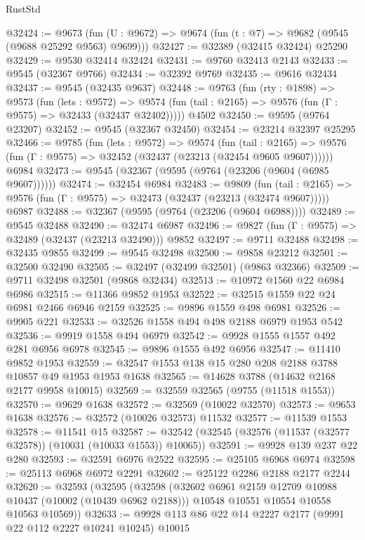 \begin{lexlean}{RustStd}
\begin{coremodule}
@32424 := @9673
    (fun (U : @9672) => @9674 (fun (t : @7) => @9682 (@9545 (@9688 @25292 @9563) @9699)))
@32427 := @32389 (@32415 @32424) @25290
@32429 := @9530 @32414 @32424
@32431 := @9760 @32413 @2143
@32433 := @9545 (@32367 @9766)
@32434 := @32392 @9769
@32435 := @9616 @32434
@32437 := @9545 (@32435 @9637)
@32448 := @9763
    (fun (rty : @1898) =>
    @9573
      (fun (lets : @9572) =>
      @9574 (fun (tail : @2165) => @9576 (fun (Γ : @9575) => @32433 (@32437 @32402)))))
    @4502
@32450 := @9595 (@9764 @23207)
@32452 := @9545 (@32367 @32450)
@32454 := @23214 @32397 @25295
@32466 := @9785
    (fun (lets : @9572) =>
    @9574
      (fun (tail : @2165) =>
      @9576 (fun (Γ : @9575) => @32452 (@32437 (@23213 (@32454 @9605 @9607))))))
    @6984
@32473 := @9545 (@32367 (@9595 (@9764 (@23206 (@9604 (@6985 @9607))))))
@32474 := @32454 @6984
@32483 := @9809
    (fun (tail : @2165) => @9576 (fun (Γ : @9575) => @32473 (@32437 (@23213 (@32474 @9607)))))
    @6987
@32488 := @32367 (@9595 (@9764 (@23206 (@9604 @6988))))
@32489 := @9545 @32488
@32490 := @32474 @6987
@32496 := @9827 (fun (Γ : @9575) => @32489 (@32437 (@23213 @32490))) @9852
@32497 := @9711 @32488
@32498 := @32435 @9855
@32499 := @9545 @32498
@32500 := @9858 @23212
@32501 := @32500 @32490
@32505 := @32497 (@32499 @32501) (@9863 @32366)
@32509 := @9711 @32498 @32501 (@9868 @32434)
@32513 := @10972 @1560 @22 @6984 @6986
@32515 := @11366 @9852 @1953
@32522 := @32515 @1559 @22 @24 @6981 @2466 @6946 @2159
@32525 := @9896 @1559 @498 @6981
@32526 := @9905 @221
@32533 := @32526 @1558 @494 @498 @2188 @6979 @1953 @542
@32536 := @9919 @1558 @494 @6979
@32542 := @9928 @1555 @1557 @492 @281 @6956 @6978
@32545 := @9896 @1555 @492 @6956
@32547 := @11410 @9852 @1953
@32559 := @32547 @1553 @138 @15 @280 @208 @2188 @3788 @10857 @49 @1953 @1953 @1638
@32565 := @14628 @3788 (@14632 @2168 @2177 @9958 @10015)
@32569 := @32559 @32565 (@9755 (@11518 @1553))
@32570 := @9629 @1638
@32572 := @32569 (@10022 @32570)
@32573 := @9653 @1638
@32576 := @32572 (@10026 @32573) @11532
@32577 := @11539 @1553
@32578 := @11541 @15
@32587 := @32542 (@32545 (@32576 (@11537 (@32577 @32578)) (@10031 (@10033 @1553)) @10065))
@32591 := @9928 @139 @237 @22 @280
@32593 := @32591 @6976 @2522
@32595 := @25105 @6968 @6974
@32598 := @25113 @6968 @6972 @2291
@32602 := @25122 @2286 @2188 @2177 @2244
@32620 := @32593
    (@32595
      (@32598
        (@32602 @6961 @2159 @12709 @10988 @10437 (@10002 (@10439 @6962 @2188)))
        @10548
        @10551
        @10554
        @10558
        @10563
        @10569))
@32633 := @9928 @113 @86 @22 @14 @2227 @2177 (@9991 @22 @112 @2227 @10241 @10245) @10015

\end{coremodule}
\end{lexlean}
